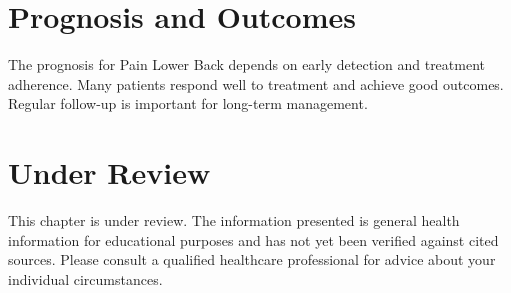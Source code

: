 \section*{Prognosis and Outcomes}
The prognosis for Pain Lower Back depends on early detection and treatment adherence. Many patients respond well to treatment and achieve good outcomes. Regular follow-up is important for long-term management.
\section*{Under Review}
This chapter is under review. The information presented is general health information for educational purposes and has not yet been verified against cited sources. Please consult a qualified healthcare professional for advice about your individual circumstances.


\clearpage
